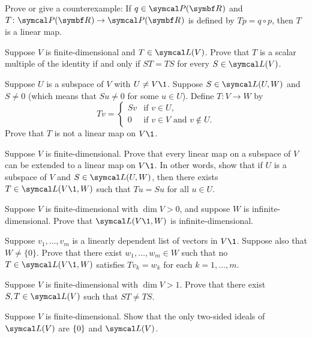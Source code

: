 \begin{exercises}
\pagebreak[3]


\exercise
Prove or give a counterexample: If $q \in \P(\R{})$ and $\fun T {\P(\R{})} {\P(\R{})}$ is defined by $Tp = q \circ p$, then $T$ is a linear map.


\exercise
Suppose $V$ is finite-dimensional and $T \in \L(V)$.  Prove that $T$ is a
scalar multiple of the identity if and  only if $ST = TS$ for every $S \in \L(V)$.


\exercise
Suppose $U$ is a subspace of $V$ with $U \ne V\1$. Suppose $S \in \L(U, W)$ and $S \ne 0$ (which means that $Su \ne 0$ for some $u \in U$). Define $T \colon V \to W$ by
\[
Tv =
\begin{cases}
Sv & \text{if } v \in U,\\
0 & \text{if } v \in V \text{\ and \ }v \notin U.
\end{cases}
\]
Prove that $T$ is not a linear map on $V\1$.


\exercise
Suppose $V$ is finite-dimensional.  Prove that every linear map on a
subspace of $V$ can be extended to a linear map on $V\1$.  In other words, show
that if $U$ is a subspace of $V$ and $S \in \L(U, W)$, then there exists
$T \in \L(V\1, W)$ such that $Tu = Su$ for all $u \in U$.\label{384}


\exercise
Suppose $V$ is finite-dimensional with $\dim V > 0$, and suppose $W$ is infinite-dimensional. Prove that $\L(V\1,W)$ is infinite-dimensional.


\exercise
Suppose $v_1, \dots, v_m$ is a linearly dependent list of vectors in $V\1$. Suppose also that $W \ne \{0\}$. Prove that there exist $w_1, \dots, w_m \in W$ such that no $T \in \L(V\1, W)$ satisfies $Tv_k = w_k$ for each $k = 1, \dots, m$.


\exercise
Suppose $V$ is finite-dimensional with $\dim V > 1$. Prove that there exist $S, T \in \L(V)$ such that $ST \ne TS$. \label{noncomm}


\exercise
Suppose $V$ is finite-dimensional. Show that the only two-sided ideals of $\L(V)$ are $\{0\}$ and $\L(V)$.
\label{ideals}



\end{exercises}
